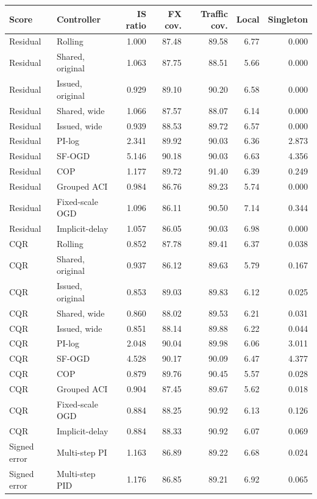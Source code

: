 \begin{tabular}{llrrrrr}
\toprule
Score & Controller & IS ratio & FX cov. & Traffic cov. & Local & Singleton \\
\midrule
Residual & Rolling & 1.000 & 87.48 & 89.58 & 6.77 & 0.000 \\
Residual & Shared, original & 1.063 & 87.75 & 88.51 & 5.66 & 0.000 \\
Residual & Issued, original & 0.929 & 89.10 & 90.20 & 6.58 & 0.000 \\
Residual & Shared, wide & 1.066 & 87.57 & 88.07 & 6.14 & 0.000 \\
Residual & Issued, wide & 0.939 & 88.53 & 89.72 & 6.57 & 0.000 \\
Residual & PI-log & 2.341 & 89.92 & 90.03 & 6.36 & 2.873 \\
Residual & SF-OGD & 5.146 & 90.18 & 90.03 & 6.63 & 4.356 \\
Residual & COP & 1.177 & 89.72 & 91.40 & 6.39 & 0.249 \\
Residual & Grouped ACI & 0.984 & 86.76 & 89.23 & 5.74 & 0.000 \\
Residual & Fixed-scale OGD & 1.096 & 86.11 & 90.50 & 7.14 & 0.344 \\
Residual & Implicit-delay & 1.057 & 86.05 & 90.03 & 6.98 & 0.000 \\
CQR & Rolling & 0.852 & 87.78 & 89.41 & 6.37 & 0.038 \\
CQR & Shared, original & 0.937 & 86.12 & 89.63 & 5.79 & 0.167 \\
CQR & Issued, original & 0.853 & 89.03 & 89.83 & 6.12 & 0.025 \\
CQR & Shared, wide & 0.860 & 88.02 & 89.53 & 6.21 & 0.031 \\
CQR & Issued, wide & 0.851 & 88.14 & 89.88 & 6.22 & 0.044 \\
CQR & PI-log & 2.048 & 90.04 & 89.98 & 6.06 & 3.011 \\
CQR & SF-OGD & 4.528 & 90.17 & 90.09 & 6.47 & 4.377 \\
CQR & COP & 0.879 & 89.76 & 90.45 & 5.57 & 0.028 \\
CQR & Grouped ACI & 0.904 & 87.45 & 89.67 & 5.62 & 0.018 \\
CQR & Fixed-scale OGD & 0.884 & 88.25 & 90.92 & 6.13 & 0.126 \\
CQR & Implicit-delay & 0.884 & 88.33 & 90.92 & 6.07 & 0.069 \\
Signed error & Multi-step PI & 1.163 & 86.89 & 89.22 & 6.68 & 0.024 \\
Signed error & Multi-step PID & 1.176 & 86.85 & 89.21 & 6.92 & 0.065 \\
\bottomrule
\end{tabular}
